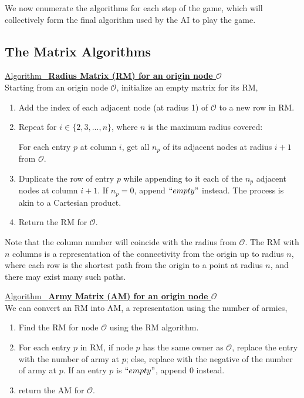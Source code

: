 \documentclass[12pt]{article}  %
\newcommand{\algtitle}[1]{\underline{Algorithm \ {\bf #1}} \vspace*{1mm}\\}
\begin{document}
We now enumerate the algorithms for each step of the game, which will collectively form the final algorithm used by the AI to play the game.


\subsection{The Matrix Algorithms}

\algtitle{Radius Matrix (RM) for an origin node $\mathcal{O}$}
Starting from an origin node $\mathcal{O}$, initialize an empty matrix for its RM,
\begin{enumerate}
	\item Add the index of each adjacent node (at radius 1) of $\mathcal{O}$ to a new row in RM.
	\item Repeat for $i \in \{2,3,...,n\}$, where $n$ is the maximum radius covered:
	
	For each entry $p$ at column $i$, get all $n_p$ of its adjacent nodes at radius $i+1$ from $\mathcal{O}$. 

	\item Duplicate the row of entry $p$ while appending to it each of the $n_p$ adjacent nodes at column $i+1$. If $n_p=0$, append $``empty"$ instead. The process is akin to a Cartesian product.

	\item Return the RM for $\mathcal{O}$.
\end{enumerate}

Note that the column number will coincide with the radius from $\mathcal{O}$. The RM with $n$ columns is a representation of the connectivity from the origin up to radius $n$, where each row is the shortest path from the origin to a point at radius $n$, and there may exist many such paths.

\algtitle{Army Matrix (AM) for an origin node $\mathcal{O}$}
We can convert an RM into AM, a representation using the number of armies,
\begin{enumerate}
	\item Find the RM for node $\mathcal{O}$ using the RM algorithm.
	\item For each entry $p$ in RM, if node $p$ has the same owner as $\mathcal{O}$, replace the entry with the number of army at $p$; else, replace with the negative of the number of army at $p$. If an entry $p$ is $``empty"$, append 0 instead.
	\item return the AM for $\mathcal{O}$.
\end{enumerate}
\end{document}
